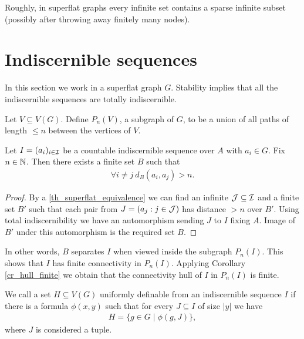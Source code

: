 Roughly, in superflat graphs every infinite set contains a sparse infinite subset (possibly after throwing away finitely many nodes).

\section{Indiscernible sequences}

In this section we work in a superflat graph $G$. Stability implies that all the indiscernible sequences are totally indiscernible.

\begin{Definition}
  Let $V \subseteq V(G)$. Define $P_n(V)$, a subgraph of $G$, to be a union of all paths of length $\leq n$ between the vertices of $V$.
\end{Definition}

\begin{Lemma} \label{lm_bump}
  Let $I = (a_i)_{i \in \operatorname{\mathcal I}}$ be a countable indiscernible sequence over $A$ with $a_i \in G$.
  Fix $n \in \mathbb{N}$.
  Then there exists a finite set $B$ such that
  \begin{align*}
    \forall i \neq j \ d_B(a_i, a_j) > n.
  \end{align*}
\end{Lemma}

\begin{proof}
  By a \ref{th_superflat_equivalence} we can find an infinite $\operatorname{\mathcal J} \subseteq \operatorname{\mathcal I}$ and a finite set $B'$
  such that each pair from $J = (a_j : j \in \operatorname{\mathcal J})$ has distance $>n$ over $B'$.
  Using total indiscernibility we have an automorphism sending $J$ to $I$ fixing $A$.
  Image of $B'$ under this automorphism is the required set $B$.
\end{proof}

In other words, $B$ separates $I$ when viewed inside the subgraph $P_n(I)$.
This shows that $I$ has finite connectivity in $P_n(I)$.
Applying Corollary \ref{cr_hull_finite} we obtain that the connectivity hull of $I$ in $P_n(I)$ is finite.

\begin{Definition}
  We call a set $H \subseteq V(G)$ uniformly definable from an indiscernible sequence $I$ if there is a formula $\phi(x, y)$ such that for every $J \subseteq I$ of size $|y|$ we have
  \begin{align*}
    H = \{g \in G \mid \phi(g, J)\},
  \end{align*}
  where $J$ is considered a tuple.
\end{Definition}

